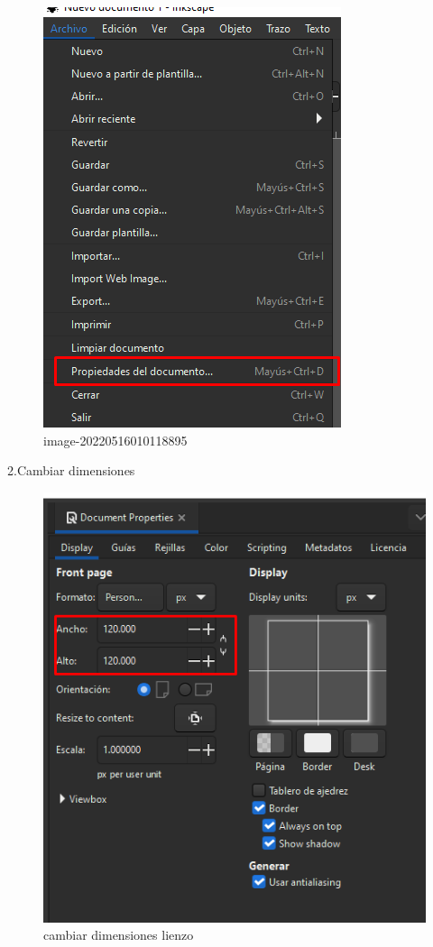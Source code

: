 \documentclass[
  spanish,
]{article}
\begin{document}
\begin{figure}
\centering
\includegraphics{img/README/image-20220516010118895.png}
\caption{image-20220516010118895}
\end{figure}

2.Cambiar dimensiones

\begin{figure}
\centering
\includegraphics{img/README/image-20220516010209321.png}
\caption{cambiar dimensiones lienzo}
\end{figure}
\end{document}
